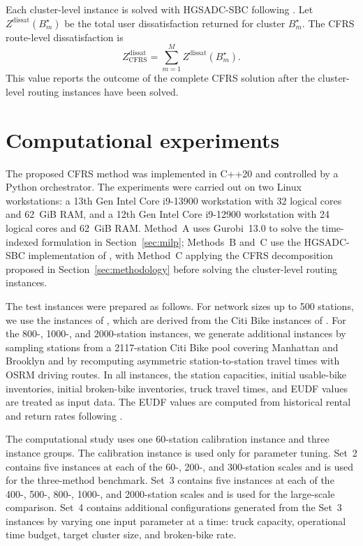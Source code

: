 Each cluster-level instance is solved with HGSADC-SBC following
\citet{huRepositioningBikeSharing2025}. Let $Z^{\mathrm{dissat}}(B_m^\star)$
be the total user dissatisfaction returned for cluster $B_m^\star$. The CFRS
route-level dissatisfaction is
\begin{equation}
Z_{\mathrm{CFRS}}^{\mathrm{dissat}}
=\sum_{m=1}^{M}Z^{\mathrm{dissat}}(B_m^\star).
\label{eq:cfrs-total-dissat}
\end{equation}
This value reports the outcome of the complete CFRS solution after the
cluster-level routing instances have been solved.

\section{Computational experiments}\label{sec:experiments}

The proposed CFRS method was implemented in C++20 and controlled by a Python
orchestrator. The experiments were carried out on two Linux workstations: a 13th
Gen Intel Core i9-13900 workstation with 32 logical cores and 62~GiB RAM, and a
12th Gen Intel Core i9-12900 workstation with 24 logical cores and 62~GiB RAM.
Method~A uses Gurobi~13.0 to solve the time-indexed formulation in
Section~\ref{sec:milp}; Methods~B and~C use the HGSADC-SBC implementation of
\citet{huRepositioningBikeSharing2025}, with Method~C applying the CFRS
decomposition proposed in Section~\ref{sec:methodology} before solving the
cluster-level routing instances.

The test instances were prepared as follows. For network sizes up to 500
stations, we use the instances of \citet{huRepositioningBikeSharing2025}, which
are derived from the Citi Bike instances of \citet{hoHybridLargeNeighborhood2017}.
For the 800-, 1000-, and 2000-station instances, we generate additional
instances by sampling stations from a 2117-station Citi Bike pool covering
Manhattan and Brooklyn and by recomputing asymmetric station-to-station travel
times with OSRM driving routes. In all instances, the station capacities,
initial usable-bike inventories, initial broken-bike inventories, truck travel
times, and EUDF values are treated as input data. The EUDF values are computed
from historical rental and return rates following
\citet{kaspiBikesharingSystemsUser2017}.

The computational study uses one 60-station calibration instance and three
instance groups. The calibration instance is used only for parameter tuning.
Set~2 contains five instances at each of the 60-, 200-, and 300-station scales
and is used for the three-method benchmark. Set~3 contains five instances at
each of the 400-, 500-, 800-, 1000-, and 2000-station scales and is used for the
large-scale comparison. Set~4 contains additional configurations generated from
the Set~3 instances by varying one input parameter at a time: truck capacity,
operational time budget, target cluster size, and broken-bike rate.

